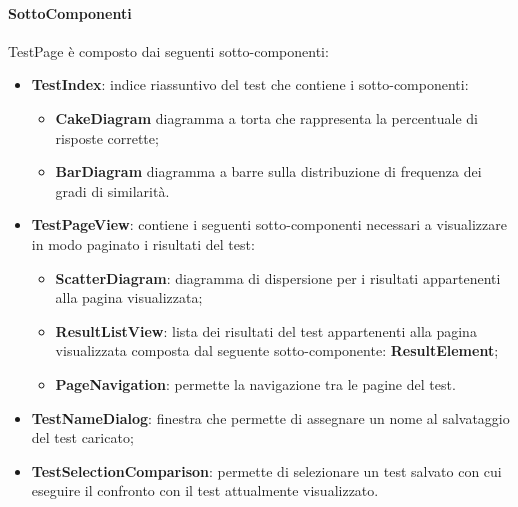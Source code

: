 \paragraph{SottoComponenti}
TestPage è composto dai seguenti sotto-componenti:
\begin{itemize}
    \item \textbf{TestIndex}: indice riassuntivo del test che contiene i sotto-componenti:
    \begin{itemize}
        \item \textbf{CakeDiagram} diagramma a torta che rappresenta la percentuale di risposte corrette;
        \item \textbf{BarDiagram} diagramma a barre sulla distribuzione di frequenza dei gradi di similarità.
    \end{itemize}  
    
    \item \textbf{TestPageView}: contiene i seguenti sotto-componenti necessari a visualizzare in modo paginato i risultati del test:
    \begin{itemize}
        \item \textbf{ScatterDiagram}: diagramma di dispersione per i risultati appartenenti alla pagina visualizzata;
        
        \item \textbf{ResultListView}: lista dei risultati del test appartenenti alla pagina visualizzata composta dal seguente sotto-componente: \textbf{ResultElement};
        
        \item \textbf{PageNavigation}: permette la navigazione tra le pagine del test.
    \end{itemize}
    \item \textbf{TestNameDialog}: finestra che permette di assegnare un nome al salvataggio del test caricato;
    \item \textbf{TestSelectionComparison}: permette di selezionare un test salvato con cui eseguire il confronto con il test attualmente visualizzato.
\end{itemize}

